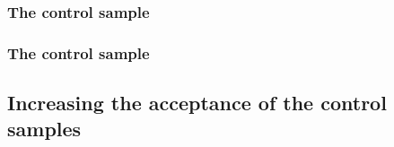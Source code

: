 \subsubsection{The \texorpdfstring{\mmj}{di-muon plus jets} control sample}

\subsubsection{The \texorpdfstring{\gj}{photon plus jets} control sample}

\subsection{Increasing the acceptance of the control samples\label{sec:larger}}


